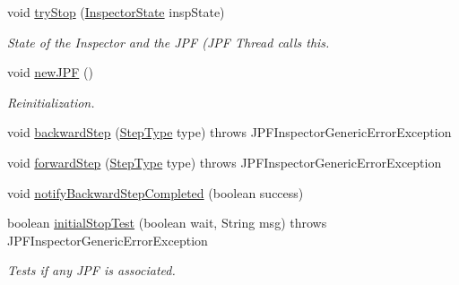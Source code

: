 \begin{DoxyCompactItemize}
void \hyperlink{classgov_1_1nasa_1_1jpf_1_1inspector_1_1server_1_1breakpoints_1_1_commands_manager_a282956ac6d94be27f91bd6a944883b2a}{try\+Stop} (\hyperlink{interfacegov_1_1nasa_1_1jpf_1_1inspector_1_1server_1_1expression_1_1_inspector_state}{Inspector\+State} insp\+State)
\begin{DoxyCompactList}\small\item\em State of the Inspector and the J\+PF (J\+PF Thread calls this. \end{DoxyCompactList}\item 
void \hyperlink{classgov_1_1nasa_1_1jpf_1_1inspector_1_1server_1_1breakpoints_1_1_commands_manager_a59d74293a23df32d7a5c029dfc5466de}{new\+J\+PF} ()
\begin{DoxyCompactList}\small\item\em Reinitialization. \end{DoxyCompactList}\item 
void \hyperlink{classgov_1_1nasa_1_1jpf_1_1inspector_1_1server_1_1breakpoints_1_1_commands_manager_aaa5d09160e05723d8d692c5382e08973}{backward\+Step} (\hyperlink{enumgov_1_1nasa_1_1jpf_1_1inspector_1_1interfaces_1_1_commands_interface_1_1_step_type}{Step\+Type} type)  throws J\+P\+F\+Inspector\+Generic\+Error\+Exception 
\item 
void \hyperlink{classgov_1_1nasa_1_1jpf_1_1inspector_1_1server_1_1breakpoints_1_1_commands_manager_ae30912de1a536e5c39dd52fed2a8d42a}{forward\+Step} (\hyperlink{enumgov_1_1nasa_1_1jpf_1_1inspector_1_1interfaces_1_1_commands_interface_1_1_step_type}{Step\+Type} type)  throws J\+P\+F\+Inspector\+Generic\+Error\+Exception 
\item 
void \hyperlink{classgov_1_1nasa_1_1jpf_1_1inspector_1_1server_1_1breakpoints_1_1_commands_manager_a17c5ac9ee6a4518e6ba74b152d1852e9}{notify\+Backward\+Step\+Completed} (boolean success)
\item 
boolean \hyperlink{classgov_1_1nasa_1_1jpf_1_1inspector_1_1server_1_1breakpoints_1_1_commands_manager_afe4795e1382183ef74cf03ea0b277c13}{initial\+Stop\+Test} (boolean wait, String msg)  throws J\+P\+F\+Inspector\+Generic\+Error\+Exception 
\begin{DoxyCompactList}\small\item\em Tests if any J\+PF is associated. \end{DoxyCompactList}\end{DoxyCompactItemize}
